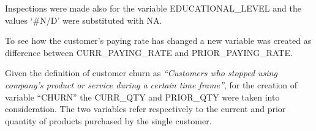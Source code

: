 \documentclass[]{article}
\newenvironment{Shaded}{\begin{snugshade}}{\end{snugshade}}
\newcommand{\KeywordTok}[1]{\textcolor[rgb]{0.13,0.29,0.53}{\textbf{#1}}}
\newcommand{\DecValTok}[1]{\textcolor[rgb]{0.00,0.00,0.81}{#1}}
\newcommand{\StringTok}[1]{\textcolor[rgb]{0.31,0.60,0.02}{#1}}
\newcommand{\OtherTok}[1]{\textcolor[rgb]{0.56,0.35,0.01}{#1}}
\newcommand{\OperatorTok}[1]{\textcolor[rgb]{0.81,0.36,0.00}{\textbf{#1}}}
\newcommand{\NormalTok}[1]{#1}
\begin{document}
\begin{Shaded}
\end{Shaded}

Inspections were made also for the variable EDUCATIONAL\_LEVEL and the
values `\#N/D' were substituted with NA.

\begin{Shaded}
\end{Shaded}

To see how the customer's paying rate has changed a new variable was
created as difference between CURR\_PAYING\_RATE and
PRIOR\_PAYING\_RATE.

Given the definition of customer churn as \emph{``Customers who stopped
using company's product or service during a certain time frame''}, for
the creation of variable ``CHURN'' the CURR\_QTY and PRIOR\_QTY were
taken into consideration. The two variables refer respectively to the
current and prior quantity of products purchased by the single customer.

\begin{Shaded}
\end{Shaded}
\end{document}
